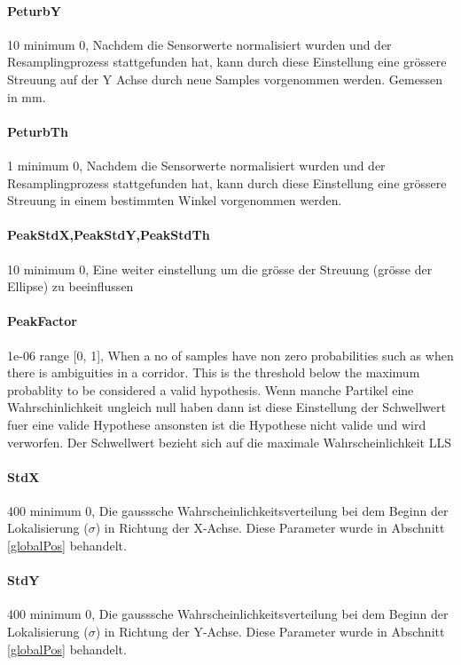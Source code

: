 \documentclass{article}
\begin{document}
\paragraph{PeturbY}\label{PeturbY} 10                minimum 0,   Nachdem die Sensorwerte normalisiert wurden und der Resamplingprozess stattgefunden hat, kann durch diese Einstellung eine gr\"ossere Streuung auf der Y Achse durch neue Samples vorgenommen werden. Gemessen in mm. 

\paragraph{PeturbTh}\label{PeturbTh} 1                minimum 0,  Nachdem die Sensorwerte normalisiert wurden und der Resamplingprozess stattgefunden hat, kann durch diese Einstellung eine gr\"ossere Streuung in einem bestimmten Winkel vorgenommen werden.

\paragraph{PeakStdX,PeakStdY,PeakStdTh} 10               minimum 0,  Eine weiter einstellung um die gr\"osse der Streuung (gr\"osse der Ellipse) zu beeinflussen


\paragraph{PeakFactor} 1e-06          range [0, 1],  When a no of samples have non zero
                          probabilities such as when there is ambiguities in a
                          corridor. This is the threshold below the maximum
                          probablity to be considered a valid hypothesis.
Wenn manche Partikel eine Wahrschinlichkeit ungleich null haben dann ist diese Einstellung der Schwellwert fuer eine valide Hypothese ansonsten ist die Hypothese nicht valide und wird verworfen. Der Schwellwert bezieht sich auf die maximale Wahrscheinlichkeit LLS


\paragraph{StdX} 400                  minimum 0,  Die gausssche Wahrscheinlichkeitsverteilung bei dem Beginn der Lokalisierung ($\sigma$) in Richtung der X-Achse. Diese Parameter wurde in Abschnitt \ref{globalPos} behandelt.

\paragraph{StdY} 400                  minimum 0,   Die gausssche Wahrscheinlichkeitsverteilung bei dem Beginn der Lokalisierung ($\sigma$) in Richtung der Y-Achse. Diese Parameter wurde in Abschnitt \ref{globalPos} behandelt.
\end{document}
